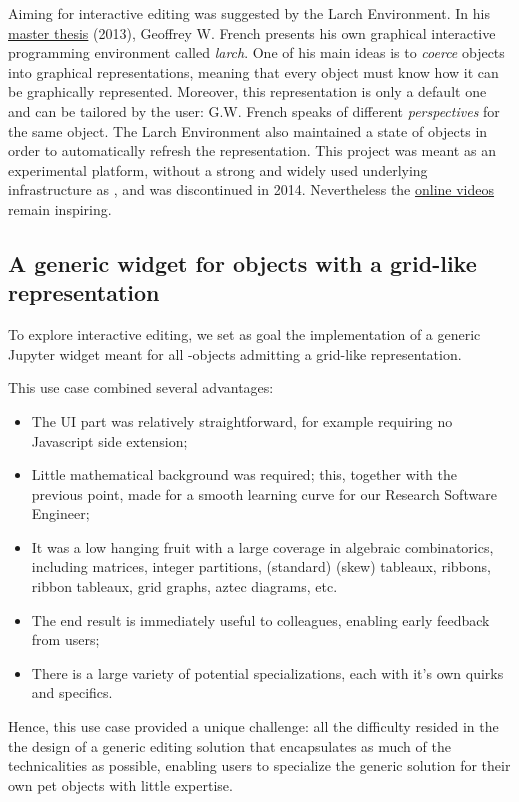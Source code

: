 \documentclass{deliverablereport}
\begin{document}
Aiming for interactive editing was suggested by the Larch Environment.
In his \href{https://core.ac.uk/download/pdf/9839511.pdf}{master
  thesis} (2013), Geoffrey W. French presents his own graphical
interactive programming environment called \emph{larch}. One of his
main ideas is to \emph{coerce} objects into graphical representations,
meaning that every object must know how it can be graphically
represented. Moreover, this representation is only a default one and can be
tailored by the user: G.W. French speaks of different
\emph{perspectives} for the same object. The Larch Environment also
maintained a state of objects in order to automatically refresh the
representation. This project was meant as an experimental platform,
without a strong and widely used underlying infrastructure as \Jupyter,
and was discontinued in 2014. Nevertheless the
\href{https://www.youtube.com/watch?v=BaqaIw2c91o&t=29s}{online videos}
remain inspiring.

\subsection{A generic widget for objects with a grid-like representation}
\label{section:grid}

To explore interactive editing, we set as goal the implementation of a
generic Jupyter widget meant for all \Sage-objects admitting a
grid-like representation.

This use case combined several advantages:
\begin{itemize}
\item The UI part was relatively straightforward, for example
  requiring no Javascript side extension;
\item Little mathematical background was required; this, together with
  the previous point, made for a smooth learning curve for our
  Research Software Engineer;
\item It was a low hanging fruit with a large coverage in algebraic
  combinatorics, including matrices, integer partitions, (standard)
  (skew) tableaux, ribbons, ribbon tableaux, grid graphs, aztec
  diagrams, etc.
\item The end result is immediately useful to colleagues, enabling
  early feedback from users;
\item There is a large variety of potential specializations, each with
  it's own quirks and specifics.
\end{itemize}
Hence, this use case provided a unique challenge: all the difficulty
resided in the the design of a generic editing solution that encapsulates as
much of the technicalities as possible, enabling users to specialize
the generic solution for their own pet objects with little expertise.
\end{document}
